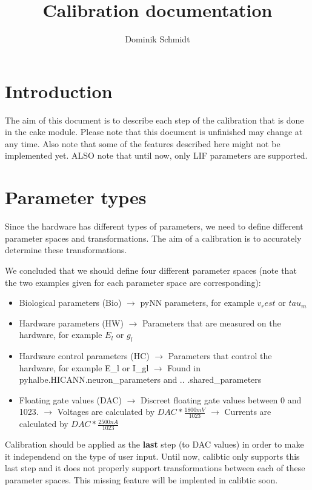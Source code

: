 \documentclass[12pt,a4paper,bibliography=totocnumbered,listof=totocnumbered]{scrartcl}
\author{Dominik Schmidt}
\title{Calibration documentation}
\begin{document}
\maketitle
\section{Introduction}
The aim of this document is to describe each step of the calibration that is done in the cake module. Please note that this document is unfinished may change at any time. Also note that some of the features described here might not be implemented yet. ALSO note that until now, only LIF parameters are supported.

\section{Parameter types}
Since the hardware has different types of parameters, we need to define different parameter spaces and transformations. The aim of a calibration is to accurately determine these transformations.

We concluded that we should define four different parameter spaces (note that the two examples given for each parameter space are corresponding):
\begin{itemize}
\item Biological parameters (Bio)
\subitem $\rightarrow$ pyNN parameters, for example $v_rest$ or $tau_m$
\item Hardware parameters (HW)
\subitem $\rightarrow$ Parameters that are measured on the hardware, for example $E_l$ or $g_l$
\item Hardware control parameters (HC)
\subitem $\rightarrow$ Parameters that control the hardware, for example E\_l or I\_gl
\subitem $\rightarrow$ Found in pyhalbe.HICANN.neuron\_parameters and .. .shared\_parameters
\item Floating gate values (DAC)
\subitem $\rightarrow$ Discreet floating gate values between 0 and 1023.
\subitem $\rightarrow$ Voltages are calculated by $DAC * \frac{1800 mV}{1023}$
\subitem $\rightarrow$ Currents are calculated by $DAC * \frac{2500 nA}{1023}$
\end{itemize}
 
Calibration should be applied as the \textbf{last} step (to DAC values) in order to make it independend on the type of user input. Until now, calibtic only supports this last step and it does not properly support transformations between each of these parameter spaces. This missing feature will be implented in calibtic soon.
\end{document}
